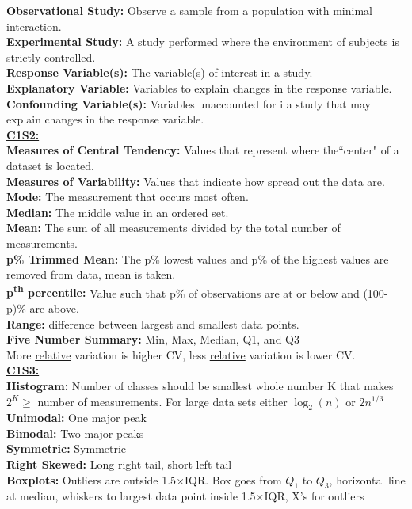 \documentclass[letter, 12pt]{article}
\begin{document}
\begin{multicols}{2}
\textbf{Observational Study:} Observe a sample from a population with minimal interaction.\\
\textbf{Experimental Study:} A study performed where the environment of subjects is strictly controlled.\\
\textbf{Response Variable(s):} The variable(s) of interest in a study.\\
\textbf{Explanatory Variable:} Variables to explain changes in the response variable.\\
\textbf{Confounding Variable(s):} Variables unaccounted for i a study that may explain changes in the response variable.\\
\textbf{\uline{C1S2:}}\\
\textbf{Measures of Central Tendency:} Values that represent where the``center" of a dataset is located.\\
\textbf{Measures of Variability:} Values that indicate how spread out the data are.\\
\textbf{Mode:} The measurement that occurs most often.\\
\textbf{Median:} The middle value in an ordered set.\\
\textbf{Mean:} The sum of all measurements divided by the total number of measurements.\\
\textbf{p\% Trimmed Mean:} The p\% lowest values and p\% of the highest values are removed from data, mean is taken.\\
\textbf{p\textsuperscript{th} percentile:} Value such that p\% of observations are at or below and (100-p)\% are above.\\
\textbf{Range:} difference between largest and smallest data points.\\
\textbf{Five Number Summary:} Min, Max, Median, Q1, and Q3\\
More \uline{relative} variation is higher CV, less \uline{relative} variation is lower CV.\\
\textbf{\uline{C1S3:}}\\
\textbf{Histogram:} Number of classes should be smallest whole number K that makes $2^K \geq$ number of measurements. For large data sets either $\log_2(n)$ or $2n^{1/3}$\\
\textbf{Unimodal:} One major peak\\
\textbf{Bimodal:} Two major peaks\\
\textbf{Symmetric:} Symmetric\\
\textbf{Right Skewed:} Long right tail, short left tail\\
\textbf{Boxplots:} Outliers are outside 1.5$\times$IQR. Box goes from $Q_1$ to $Q_3$, horizontal line at median, whiskers to largest data point inside 1.5$\times$IQR, X's for outliers\\

\end{multicols}
\end{document}
